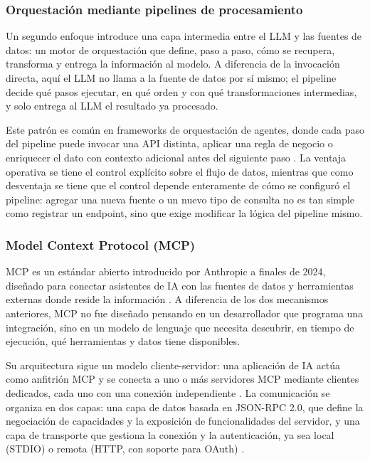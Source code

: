 \subsubsection{Orquestación mediante pipelines de procesamiento}

Un segundo enfoque introduce una capa intermedia entre el LLM y las fuentes de datos: un motor de orquestación que define, paso a paso, cómo se recupera, transforma y entrega la información al modelo. A diferencia de la invocación directa, aquí el LLM no llama a la fuente de datos por sí mismo; el pipeline decide qué pasos ejecutar, en qué orden y con qué transformaciones intermedias, y solo entrega al LLM el resultado ya procesado.

Este patrón es común en frameworks de orquestación de agentes, donde cada paso del pipeline puede invocar una API distinta, aplicar una regla de negocio o enriquecer el dato con contexto adicional antes del siguiente paso \cite{EhteshamAgentProtocols2025}. La ventaja operativa se tiene el control explícito sobre el flujo de datos, mientras que como desventaja se tiene que el control depende enteramente de cómo se configuró el pipeline: agregar una nueva fuente o un nuevo tipo de consulta no es tan simple como registrar un endpoint, sino que exige modificar la lógica del pipeline mismo.

\subsubsection{Model Context Protocol (MCP)}

MCP es un estándar abierto introducido por Anthropic a finales de 2024, diseñado para conectar asistentes de IA con las fuentes de datos y herramientas externas donde reside la información \cite{anthropic2024intro}. A diferencia de los dos mecanismos anteriores, MCP no fue diseñado pensando en un desarrollador que programa una integración, sino en un modelo de lenguaje que necesita descubrir, en tiempo de ejecución, qué herramientas y datos tiene disponibles.

Su arquitectura sigue un modelo cliente-servidor: una aplicación de IA actúa como anfitrión MCP y se conecta a uno o más servidores MCP mediante clientes dedicados, cada uno con una conexión independiente \cite{anthropic2024arch}. La comunicación se organiza en dos capas: una capa de datos basada en JSON-RPC 2.0, que define la negociación de capacidades y la exposición de funcionalidades del servidor, y una capa de transporte que gestiona la conexión y la autenticación, ya sea local (STDIO) o remota (HTTP, con soporte para OAuth) \cite{anthropic2024arch}.

